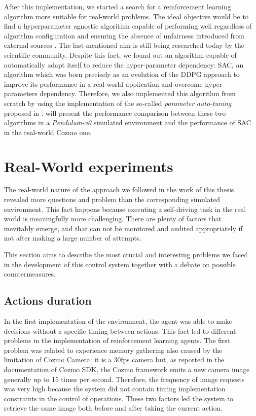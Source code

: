After this implementation, we started a search for a reinforcement learning algorithm more suitable for real-world problems.
The ideal objective would be to find a hyperparameter agnostic algorithm capable of performing well regardless of algorithm configuration and ensuring the absence of unfairness introduced from external sources \cite{henderson2018deep}.
The last-mentioned aim is still being researched today by the scientific community.
Despite this fact, we found out an algorithm capable of automatically adapt itself to reduce the hyper-parameter dependency: SAC, an algorithm which was born precisely as an evolution of the DDPG approach to improve its performance in a real-world application and overcome hyper-parameters dependency.
Therefore, we also implemented this algorithm from scratch by using the implementation of the so-called \textit{parameter auto-tuning} proposed in \cite{haarnoja2018soft, haarnoja2018alg}.
 will present the performance comparison between these two algorithms in a \textit{Pendulum-v0} simulated environment and the performance of SAC in the real-world Cozmo one.

\section{Real-World experiments}

The real-world nature of the approach we followed in the work of this thesis revealed more questions and problem than the corresponding simulated environment.
This fact happens because executing a self-driving task in the real world is meaningfully more challenging.
There are plenty of factors that inevitably emerge, and that can not be monitored and audited appropriately if not after making a large number of attempts.

This section aims to describe the most crucial and interesting problems we faced in the development of this control system together with a debate on possible countermeasures.

\subsection{Actions duration} \label{subsec:actions-duration}

In the first implementation of the environment, the agent was able to make decisions without a specific timing between actions.
This fact led to different problems in the implementation of reinforcement learning agents.
The first problem was related to experience memory gathering also caused by the limitation of Cozmo Camera: it is a 30fps camera but, as reported in the documentation of Cozmo SDK, the Cozmo framework emits a new camera image generally up to 15 times per second.
Therefore, the frequency of image requests was very high because the system did not contain timing implementation constraints in the control of operations.
These two factors led the system to retrieve the same image both before and after taking the current action.

